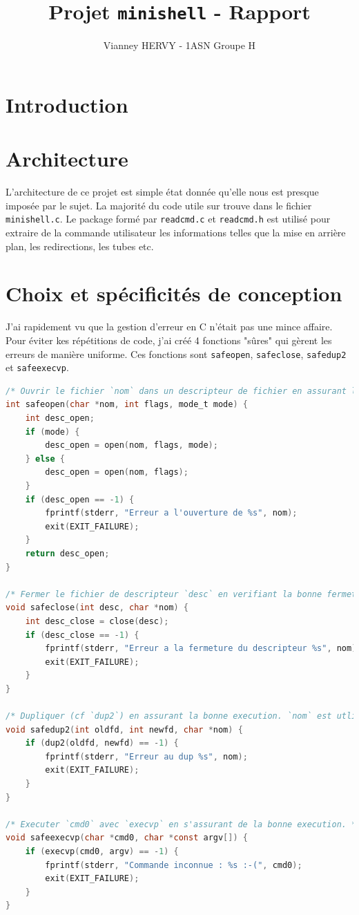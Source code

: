 \documentclass{article}
\title{Projet \texttt{minishell} - Rapport}
\author{Vianney HERVY - 1ASN Groupe H}
\begin{document}
\maketitle
\tableofcontents

\section{Introduction}


\section{Architecture}

L'architecture de ce projet est simple état donnée qu'elle nous est presque imposée par le sujet. La majorité du code utile sur trouve dans le fichier \texttt{minishell.c}. Le package formé par \texttt{readcmd.c} et \texttt{readcmd.h} est utilisé pour extraire de la commande utilisateur les informations telles que la mise en arrière plan, les redirections, les tubes etc.

\section{Choix et spécificités de conception}

J'ai rapidement vu que la gestion d'erreur en C n'était pas une mince affaire. Pour éviter kes répétitions de code, j'ai créé 4 fonctions "sûres" qui gèrent les erreurs de manière uniforme. Ces fonctions sont \texttt{safeopen}, \texttt{safeclose}, \texttt{safedup2} et \texttt{safeexecvp}.

\begin{lstlisting}[language=C, caption=Code des fonctions "sûres"]
/* Ouvrir le fichier `nom` dans un descripteur de fichier en assurant la bonne execution. Retourne le descripteur de fichier associe. */
int safeopen(char *nom, int flags, mode_t mode) {
    int desc_open;
    if (mode) {
        desc_open = open(nom, flags, mode);
    } else {
        desc_open = open(nom, flags);
    }
    if (desc_open == -1) {
        fprintf(stderr, "Erreur a l'ouverture de %s", nom);
        exit(EXIT_FAILURE);
    }
    return desc_open;
}

/* Fermer le fichier de descripteur `desc` en verifiant la bonne fermeture. `nom` est utilise en cas d'erreur. */
void safeclose(int desc, char *nom) {
    int desc_close = close(desc);
    if (desc_close == -1) {
        fprintf(stderr, "Erreur a la fermeture du descripteur %s", nom);
        exit(EXIT_FAILURE);
    }
}

/* Dupliquer (cf `dup2`) en assurant la bonne execution. `nom` est utlise en cas d'erreur. */
void safedup2(int oldfd, int newfd, char *nom) {
    if (dup2(oldfd, newfd) == -1) {
        fprintf(stderr, "Erreur au dup %s", nom);
        exit(EXIT_FAILURE);
    }
}

/* Executer `cmd0` avec `execvp` en s'assurant de la bonne execution. */
void safeexecvp(char *cmd0, char *const argv[]) {
    if (execvp(cmd0, argv) == -1) {
        fprintf(stderr, "Commande inconnue : %s :-(", cmd0);
        exit(EXIT_FAILURE);
    }
}
\end{lstlisting}
\end{document}
